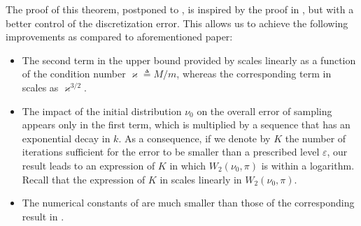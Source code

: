 \documentclass[a4paper,bej,preprint,reqno]{imsart}
\begin{document}
The proof of this theorem, postponed to , is inspired by the proof
in \citep{Cheng2}, but with a better control of the discretization error.
This allows us to achieve the following improvements as compared to aforementioned paper:
\vspace{-10pt}
\begin{itemize}\itemsep=0pt
\item The second term in the upper bound provided by  scales linearly
as a function of the condition number $\varkappa\triangleq M/m$, whereas the corresponding term in \citep{Cheng2} scales as $\varkappa^{3/2}$.

\item The impact of the initial distribution $\nu_0$ on the overall error of sampling
appears only in the first term, which is multiplied by a sequence that has an exponential
decay in $k$.  As a consequence, if we denote by
$K$ the number of iterations sufficient for the error to be smaller than a prescribed
level $\varepsilon$, our result leads to an expression of $K$ in which $W_2(\nu_0,\pi)$
is within a logarithm. Recall that the expression of $K$ in \citep[Theorem 1]{Cheng2}
scales linearly in $W_2(\nu_0,\pi)$.

\item The numerical constants of  are much smaller than those
of the corresponding result in \citep{Cheng2}.
\end{itemize}
\end{document}
